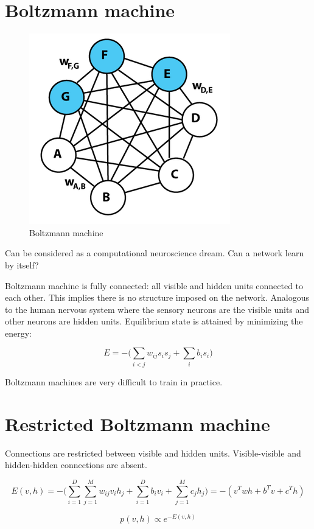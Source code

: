 \documentclass[]{article}
\title{}
\author{}
\date{}
\begin{document}
\section{Boltzmann machine}\label{boltzmann-machine}

\begin{figure}
\centering
\includegraphics{data/220px-Boltzmannexamplev1.png}
\caption{Boltzmann machine}
\end{figure}

Can be considered as a computational neuroscience dream. Can a network
learn by itself?

Boltzmann machine is fully connected: all visible and hidden units
connected to each other. This implies there is no structure imposed on
the network. Analogous to the human nervous system where the sensory
neurons are the visible units and other neurons are hidden units.
Equilibrium state is attained by minimizing the energy:

\[E = -\big(\sum_{i<j}w_{ij}s_is_j + \sum_{i}b_is_i\big)\]

Boltzmann machines are very difficult to train in practice.

\section{Restricted Boltzmann
machine}\label{restricted-boltzmann-machine}

Connections are restricted between visible and hidden units.
Visible-visible and hidden-hidden connections are absent.

\[E(v, h) = -\big(\sum_{i=1}^{D}\sum_{j=1}^{M}w_{ij}v_ih_j + \sum_{i=1}^{D}b_iv_i + \sum_{j=1}^{M}c_jh_j\big) = -(v^Twh + b^Tv + c^Th)\]

\[p(v,h) \propto e^{-E(v,h)}\]
\end{document}
